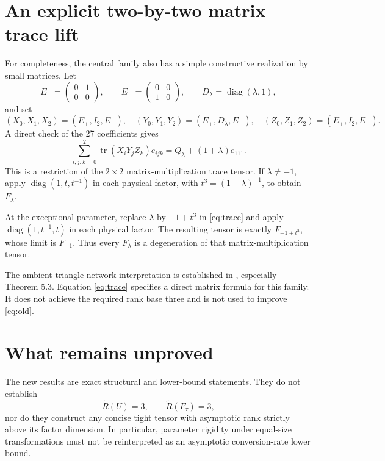 \documentclass[11pt]{article}
\theoremstyle{remark}\newtheorem{remark}[theorem]{Remark}
\newcommand{\tr}{\operatorname{tr}}
\newcommand{\diag}{\operatorname{diag}}
\newcommand{\AR}{\widetilde R}
\begin{document}
\section{An explicit two-by-two matrix trace lift}\label{sec:trace}
For completeness, the central family also has a simple constructive realization by small matrices. Let
\[
 E_+=\begin{pmatrix}0&1\\0&0\end{pmatrix},\qquad
 E_-=\begin{pmatrix}0&0\\1&0\end{pmatrix},\qquad
 D_\lambda=\diag(\lambda,1),
\]
and set
\[
 (X_0,X_1,X_2)=(E_+,I_2,E_-),\quad
 (Y_0,Y_1,Y_2)=(E_+,D_\lambda,E_-),\quad
 (Z_0,Z_1,Z_2)=(E_+,I_2,E_-).
\]
A direct check of the 27 coefficients gives
\begin{equation}\label{eq:trace}
 \sum_{i,j,k=0}^2\tr(X_iY_jZ_k)e_{ijk}
 =Q_\lambda+(1+\lambda)e_{111}.
\end{equation}
This is a restriction of the $2\times2$ matrix-multiplication trace tensor. If $\lambda\ne-1$, apply $\diag(1,t,t^{-1})$ in each physical factor, with $t^3=(1+\lambda)^{-1}$, to obtain $F_\lambda$.

At the exceptional parameter, replace $\lambda$ by $-1+t^3$ in \eqref{eq:trace} and apply $\diag(1,t^{-1},t)$ in each physical factor. The resulting tensor is exactly $F_{-1+t^3}$, whose limit is $F_{-1}$. Thus every $F_\lambda$ is a degeneration of that matrix-multiplication tensor.

The ambient triangle-network interpretation is established in \cite{triangle}, especially Theorem 5.3. Equation \eqref{eq:trace} specifies a direct matrix formula for this family. It does not achieve the required rank base three and is not used to improve \eqref{eq:old}.

\section{What remains unproved}\label{sec:gap}
The new results are exact structural and lower-bound statements. They do not establish
\[
 \AR(U)=3,\qquad \AR(F_\tau)=3,
\]
nor do they construct any concise tight tensor with asymptotic rank strictly above its factor dimension. In particular, parameter rigidity under equal-size transformations must not be reinterpreted as an asymptotic conversion-rate lower bound.
\end{document}
